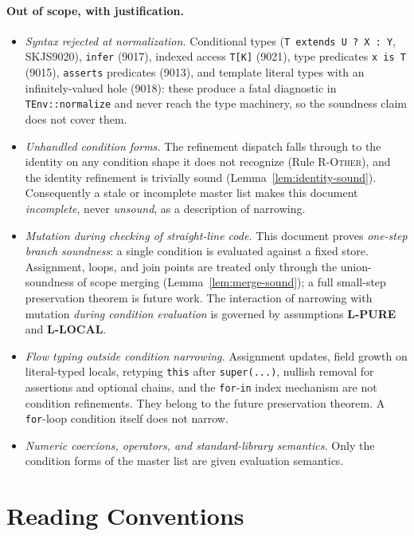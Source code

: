 \documentclass[11pt]{article}
\begin{document}
\paragraph{Out of scope, with justification.}
\begin{itemize}
\item \emph{Syntax rejected at normalization.} Conditional types
  (\texttt{T extends U ? X : Y}, SKJS9020), \texttt{infer} (9017), indexed
  access \texttt{T[K]} (9021), type predicates
  \texttt{x is T} (9015), \texttt{asserts} predicates (9013), and template
  literal types with an infinitely-valued hole (9018): these produce a
  fatal diagnostic in \texttt{TEnv::normalize} and never reach the type
  machinery, so the soundness claim does not cover them.
\item \emph{Unhandled condition forms.} The refinement dispatch falls through
  to the identity on any condition shape it does not recognize
  (Rule \textsc{R-Other}), and the identity refinement is trivially sound
  (Lemma~\ref{lem:identity-sound}). Consequently a stale or incomplete master
  list makes this document \emph{incomplete}, never \emph{unsound}, as a
  description of narrowing.
\item \emph{Mutation during checking of straight-line code.} This document
  proves \emph{one-step branch soundness}: a single condition is evaluated
  against a fixed store. Assignment, loops, and join points are treated only
  through the union-soundness of scope merging
  (Lemma~\ref{lem:merge-sound}); a full small-step preservation theorem is
  future work. The interaction of narrowing with mutation \emph{during
  condition evaluation} is governed by assumptions
  \textbf{L-PURE} and \textbf{L-LOCAL}.
\item \emph{Flow typing outside condition narrowing.} Assignment updates,
  field growth on literal-typed locals, retyping \texttt{this} after
  \texttt{super(...)}, nullish removal for assertions and optional chains,
  and the \texttt{for}-\texttt{in} index mechanism are not condition
  refinements. They belong to the future preservation theorem. A
  \texttt{for}-loop condition itself does not narrow.
\item \emph{Numeric coercions, operators, and standard-library semantics.}
  Only the condition forms of the master list are given evaluation semantics.
\end{itemize}

\section{Reading Conventions}
\end{document}
